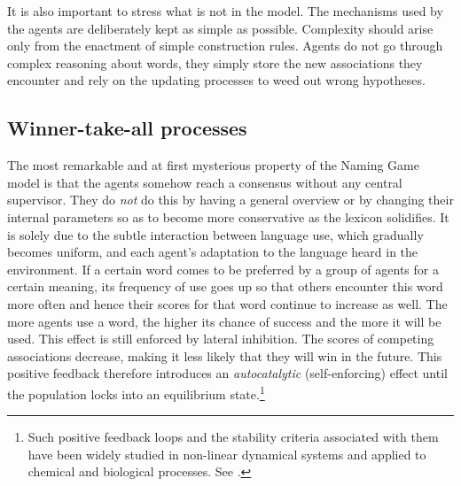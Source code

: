 It is also important to stress what is not in the model. 
The mechanisms used by the agents are deliberately kept as 
simple as possible. Complexity should arise only from the 
enactment of simple construction rules. Agents do not 
go through complex reasoning about words, they simply 
store the new associations they encounter and rely on 
the updating processes to weed out wrong hypotheses. 

\subsection{Winner-take-all processes}

The most remarkable and at first mysterious property of the 
Naming Game model is that the agents somehow reach a consensus
without any central supervisor. They do {\itshape not} do this by 
having a general overview or by changing their internal 
parameters so as to become more conservative as the lexicon
solidifies. It is solely due to the subtle interaction between
language use, which gradually becomes uniform, and each agent's
adaptation to the language heard in the environment. 
If a certain word comes to be preferred by a group of agents
for a certain meaning, its frequency of use goes up so that
others encounter this 
word more often and hence their scores for that word
continue to increase as well.
The more agents use a word, the higher its chance of success
and the more it will be used. This effect is still enforced 
by lateral inhibition. The scores of competing associations 
decrease, making it less likely that they will win in the future. 
This positive feedback therefore introduces an 
{\itshape autocatalytic} (self-enforcing) effect until the population
locks into an equilibrium state.\footnote{
Such positive feedback loops and the stability criteria
associated with them have been widely studied in non-linear
dynamical systems and applied to chemical and biological 
processes. See \cite{Babloyantz:1986}.}


